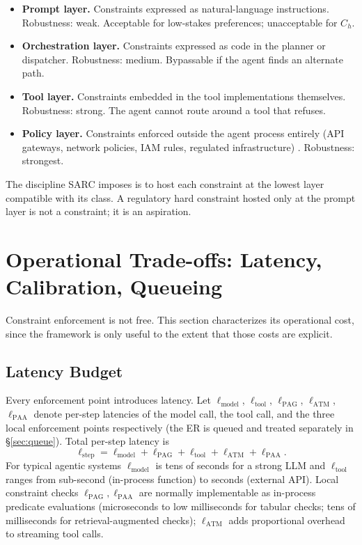 \documentclass[11pt,a4paper]{article}
\theoremstyle{remark}
\begin{document}
\begin{itemize}[leftmargin=2em,topsep=0.3em,itemsep=0.3em]
\item \textbf{Prompt layer.} Constraints expressed as natural-language instructions. Robustness: weak. Acceptable for low-stakes preferences; unacceptable for $C_h$.
\item \textbf{Orchestration layer.} Constraints expressed as code in the planner or dispatcher. Robustness: medium. Bypassable if the agent finds an alternate path.
\item \textbf{Tool layer.} Constraints embedded in the tool implementations themselves. Robustness: strong. The agent cannot route around a tool that refuses.
\item \textbf{Policy layer.} Constraints enforced outside the agent process entirely (API gateways, network policies, IAM rules, regulated infrastructure) \cite{jin2017opa,baier2024policymachine}. Robustness: strongest.
\end{itemize}

The discipline SARC imposes is to host each constraint at the lowest layer compatible with its class. A regulatory hard constraint hosted only at the prompt layer is not a constraint; it is an aspiration.

\section{Operational Trade-offs: Latency, Calibration, Queueing}\label{sec:ops}

Constraint enforcement is not free. This section characterizes its operational cost, since the framework is only useful to the extent that those costs are explicit.

\subsection{Latency Budget}\label{sec:latency}

Every enforcement point introduces latency. Let $\ell_{\text{model}}$, $\ell_{\text{tool}}$, $\ell_{\text{PAG}}$, $\ell_{\text{ATM}}$, $\ell_{\text{PAA}}$ denote per-step latencies of the model call, the tool call, and the three local enforcement points respectively (the ER is queued and treated separately in \S\ref{sec:queue}). Total per-step latency is
\[
    \ell_{\text{step}} = \ell_{\text{model}} + \ell_{\text{PAG}} + \ell_{\text{tool}} + \ell_{\text{ATM}} + \ell_{\text{PAA}}.
\]
For typical agentic systems $\ell_{\text{model}}$ is tens of seconds for a strong LLM and $\ell_{\text{tool}}$ ranges from sub-second (in-process function) to seconds (external API). Local constraint checks $\ell_{\text{PAG}}, \ell_{\text{PAA}}$ are normally implementable as in-process predicate evaluations (microseconds to low milliseconds for tabular checks; tens of milliseconds for retrieval-augmented checks); $\ell_{\text{ATM}}$ adds proportional overhead to streaming tool calls.
\end{document}

